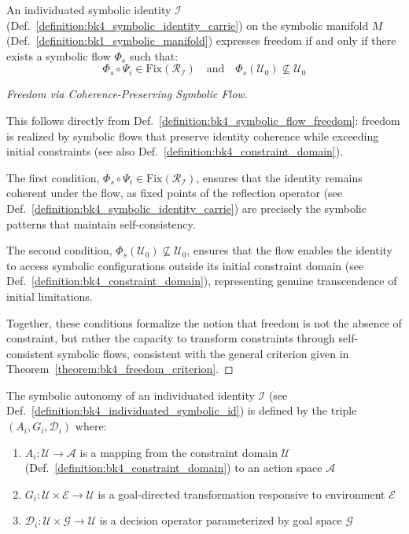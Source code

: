 \begin{theorem} \label{theorem:bk4_freedom_criterion}
An individuated symbolic identity $\mathcal{I}$ (Def.~\ref{definition:bk4_symbolic_identity_carrie}) on the symbolic manifold $M$ (Def.~\ref{definition:bk1_symbolic_manifold}) expresses freedom if and only if there exists a symbolic flow $\Phi_s$ such that:
\begin{equation}
    \Phi_s \circ \Psi_i \in \text{Fix}(\mathcal{R}_{\mathcal{I}}) \quad \text{and} \quad \Phi_s(\mathcal{U}_0) \not\subseteq \mathcal{U}_0
\end{equation}
\end{theorem}
\begin{proof}[Freedom via Coherence-Preserving Symbolic Flow]
\label{proof:bk4_freedom_via_symbolic_flow}
\leavevmode

This follows directly from
Def.~\ref{definition:bk4_symbolic_flow_freedom}: freedom is realized by
symbolic flows that preserve identity coherence while exceeding initial
constraints (see also Def.~\ref{definition:bk4_constraint_domain}).

The first condition, $\Phi_s \circ \Psi_i \in \text{Fix}(\mathcal{R}_{\mathcal{I}})$, ensures that the identity remains coherent under the flow, as fixed points of the reflection operator (see Def.~\ref{definition:bk4_symbolic_identity_carrie}) are precisely the symbolic patterns that maintain self-consistency.

The second condition, $\Phi_s(\mathcal{U}_0) \not\subseteq \mathcal{U}_0$, ensures that the flow enables the identity to access symbolic configurations outside its initial constraint domain (see Def.~\ref{definition:bk4_constraint_domain}), representing genuine transcendence of initial limitations.

Together, these conditions formalize the notion that freedom is not the absence of constraint, but rather the capacity to transform constraints through self-consistent symbolic flows, consistent with the general criterion given in Theorem~\ref{theorem:bk4_freedom_criterion}.
\end{proof}

\begin{definition}
\label{definition:bk4_symbolic_autonomy}
The symbolic autonomy of an individuated identity $\mathcal{I}$ (see Def.~\ref{definition:bk4_individuated_symbolic_id}) is defined by the triple $(A_i, G_i, \mathcal{D}_i)$ where:
\begin{enumerate}
    \item $A_i: \mathcal{U} \to \mathcal{A}$ is a mapping from the constraint domain $\mathcal{U}$ (Def.~\ref{definition:bk4_constraint_domain}) to an action space $\mathcal{A}$
    \item $G_i: \mathcal{U} \times \mathcal{E} \to \mathcal{U}$ is a goal-directed transformation responsive to environment $\mathcal{E}$
    \item $\mathcal{D}_i: \mathcal{U} \times \mathcal{G} \to \mathcal{U}$ is a decision operator parameterized by goal space $\mathcal{G}$
\end{enumerate}
\end{definition}

